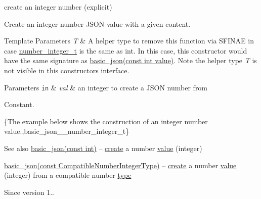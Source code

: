 create an integer number (explicit) 

Create an integer number J\+S\+ON value with a given content.


\begin{DoxyTemplParams}{Template Parameters}
{\em T} & A helper type to remove this function via S\+F\+I\+N\+AE in case \hyperlink{classnlohmann_1_1basic__json_ac4b10b2364f26ce47bdb9a413ff04a59}{number\+\_\+integer\+\_\+t} is the same as {\ttfamily int}. In this case, this constructor would have the same signature as \hyperlink{classnlohmann_1_1basic__json_a70ae1f0747f5b7a89979512866474f1a}{basic\+\_\+json(const int value)}. Note the helper type {\itshape T} is not visible in this constructor\textquotesingle{}s interface.\\
\hline
\end{DoxyTemplParams}

\begin{DoxyParams}[1]{Parameters}
\mbox{\tt in}  & {\em val} & an integer to create a J\+S\+ON number from\\
\hline
\end{DoxyParams}
Constant.

\{The example below shows the construction of an integer number value.,basic\+\_\+json\+\_\+\+\_\+number\+\_\+integer\+\_\+t\}

\begin{DoxySeeAlso}{See also}
\hyperlink{classnlohmann_1_1basic__json_a70ae1f0747f5b7a89979512866474f1a}{basic\+\_\+json(const int)} -- \hyperlink{classnlohmann_1_1basic__json_afdb7a485369fbfd8c4c7c134ebb1feb5}{create} a number \hyperlink{classnlohmann_1_1basic__json_a407e73a037e6e3067ef7aa2c25a79f39}{value} (integer) 

\hyperlink{classnlohmann_1_1basic__json_ad2eddc2c13ab084f067eaba65d381ad2}{basic\+\_\+json(const Compatible\+Number\+Integer\+Type)} -- \hyperlink{classnlohmann_1_1basic__json_afdb7a485369fbfd8c4c7c134ebb1feb5}{create} a number \hyperlink{classnlohmann_1_1basic__json_a407e73a037e6e3067ef7aa2c25a79f39}{value} (integer) from a compatible number \hyperlink{classnlohmann_1_1basic__json_a5d466b240d0ba9f648d7fd4ff42359f5}{type}
\end{DoxySeeAlso}
\begin{DoxySince}{Since}
version 1.. 
\end{DoxySince}
\hypertarget{classnlohmann_1_1basic__json_a70ae1f0747f5b7a89979512866474f1a}{}\label{classnlohmann_1_1basic__json_a70ae1f0747f5b7a89979512866474f1a} 
